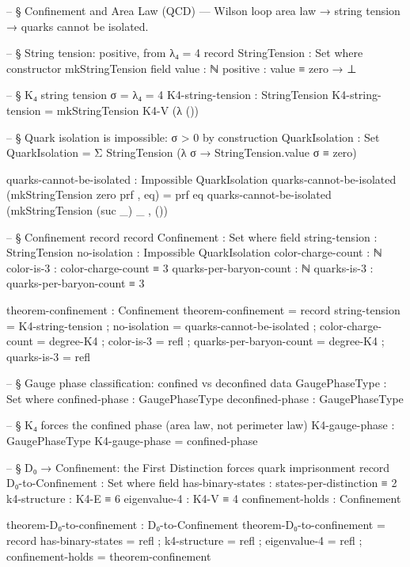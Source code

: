 \documentclass[11pt,a4paper]{book}
\begin{document}
\begin{code}
-- § Confinement and Area Law (QCD) — Wilson loop area law → string tension → quarks cannot be isolated.

-- § String tension: positive, from λ₄ = 4
record StringTension : Set where
  constructor mkStringTension
  field
    value    : ℕ
    positive : value ≡ zero → ⊥

-- § K₄ string tension σ = λ₄ = 4
K4-string-tension : StringTension
K4-string-tension = mkStringTension K4-V (λ ())

-- § Quark isolation is impossible: σ > 0 by construction
QuarkIsolation : Set
QuarkIsolation = Σ StringTension (λ σ → StringTension.value σ ≡ zero)

quarks-cannot-be-isolated : Impossible QuarkIsolation
quarks-cannot-be-isolated (mkStringTension zero prf , eq) = prf eq
quarks-cannot-be-isolated (mkStringTension (suc _) _ , ())

-- § Confinement record
record Confinement : Set where
  field
    string-tension     : StringTension
    no-isolation       : Impossible QuarkIsolation
    color-charge-count : ℕ
    color-is-3         : color-charge-count ≡ 3
    quarks-per-baryon-count : ℕ
    quarks-is-3        : quarks-per-baryon-count ≡ 3

theorem-confinement : Confinement
theorem-confinement = record
  { string-tension    = K4-string-tension
  ; no-isolation      = quarks-cannot-be-isolated
  ; color-charge-count = degree-K4
  ; color-is-3        = refl
  ; quarks-per-baryon-count = degree-K4
  ; quarks-is-3       = refl }

-- § Gauge phase classification: confined vs deconfined
data GaugePhaseType : Set where
  confined-phase   : GaugePhaseType
  deconfined-phase : GaugePhaseType

-- § K₄ forces the confined phase (area law, not perimeter law)
K4-gauge-phase : GaugePhaseType
K4-gauge-phase = confined-phase

-- § D₀ → Confinement: the First Distinction forces quark imprisonment
record D₀-to-Confinement : Set where
  field
    has-binary-states  : states-per-distinction ≡ 2
    k4-structure      : K4-E ≡ 6
    eigenvalue-4      : K4-V ≡ 4
    confinement-holds : Confinement

theorem-D₀-to-confinement : D₀-to-Confinement
theorem-D₀-to-confinement = record
  { has-binary-states  = refl
  ; k4-structure      = refl
  ; eigenvalue-4      = refl
  ; confinement-holds = theorem-confinement }
\end{code}
\end{document}
